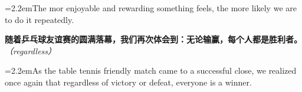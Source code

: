 \documentclass[11pt,a4paper]{article}
\newcommand{\num}[1]{\makebox[1.9em][r]{#1.}\hspace{0.3em}}
\newcommand{\prompt}[1]{\emph{\textcolor{tipblue}{\small（#1）}}}
\begin{document}
\vspace{0.15em}

\noindent\hangindent=2.2em\hspace{2.2em}The mor enjoyable and rewarding something feels, the more likely we are to do it repeatedly.

\num{5}\textbf{随着乒乓球友谊赛的圆满落幕，我们再次体会到：无论输赢，每个人都是胜利者。}\prompt{regardless}

\vspace{0.15em}

\noindent\hangindent=2.2em\hspace{2.2em}As the table tennis friendly match came to a successful close, we realized once again that regardless of victory or defeat, everyone is a winner.
\end{document}
